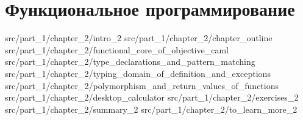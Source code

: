 \chapter{Функциональное программирование}
\label{chpt:functional_programming}

 {src/part_1/chapter_2/intro_2}
 {src/part_1/chapter_2/chapter_outline}
 {src/part_1/chapter_2/functional_core_of_objective_caml}
 {src/part_1/chapter_2/type_declarations_and_pattern_matching}
 {src/part_1/chapter_2/typing_domain_of_definition_and_exceptions}
 {src/part_1/chapter_2/polymorphism_and_return_values_of_functions}
 {src/part_1/chapter_2/desktop_calculator}
 {src/part_1/chapter_2/exercises_2}
 {src/part_1/chapter_2/summary_2}
 {src/part_1/chapter_2/to_learn_more_2}